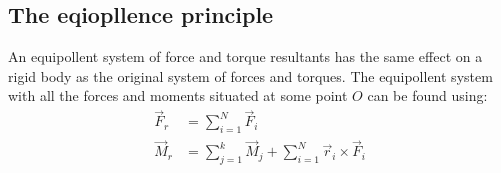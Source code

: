\documentclass[11pt, a4paper]{article}
\begin{document}
\subsection{The eqiopllence principle}
An equipollent system of force and torque resultants has the same effect on a rigid body as the original system of forces and torques. The equipollent system with all the forces and moments situated at some point $O$ can be found using:
\begin{align*}
  \vec{F}_r &= \sum_{i=1}^{N} \vec{F}_i\\
  \vec{M}_r &= \sum_{j=1}^{k} \vec{M}_j + \sum_{i=1}^{N} \vec{r}_i \times \vec{F}_i
\end{align*}
\end{document}
